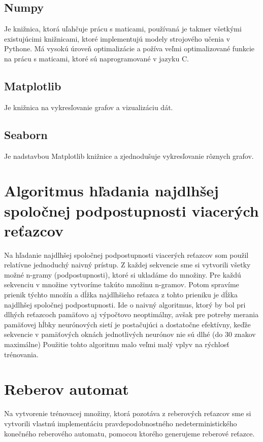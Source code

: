 \subsection{Numpy}
Je knižnica, ktorá uľahčuje prácu s maticami, používaná je takmer všetkými existujúcimi
knižnicami, ktoré implementujú modely strojového učenia v Pythone. Má vysokú úroveň optimalizácie
a požíva veľmi optimalizované funkcie na prácu s maticami, ktoré sú naprogramované v jazyku C.
\subsection{Matplotlib}
Je knižnica na vykresľovanie grafov a vizualizáciu dát.
\subsection{Seaborn}
Je nadstavbou Matplotlib knižnice a zjednodušuje vykresľovanie rôznych grafov.

\section{Algoritmus hľadania najdlhšej spoločnej podpostupnosti viacerých reťazcov}
Na hľadanie najdlhšej spoločnej podpostupnosti viacerých reťazcov som použil relatívne jednoduchý naivný prístup. 
Z každej sekvencie sme si vytvorili všetky možné n-gramy (podpostupnosti), ktoré si ukladáme do množiny.
Pre každú sekvenciu v množine vytvoríme takúto množinu n-gramov. Potom spravíme prienik týchto množín a dĺžka najdlhšieho 
reťazca z tohto prieniku je dĺžka najdlhšej spoločnej podpostupnosti. Ide o naivný algoritmus, ktorý by bol pri
dlhých reťazcoch pamäťovo aj výpočtovo neoptimálny, avšak pre potreby merania pamäťovej hĺbky neurónových sietí
je postačujúci a dostatočne efektívny, keďže sekvencie v pamäťových oknách 
jednotlivých neurónov nie sú dlhé (do 30 znakov maximálne)
Použitie tohto algoritmu malo veľmi malý vplyv na rýchlosť trénovania.

\section{Reberov automat}
Na vytvorenie trénovacej množiny, ktorá pozotáva z reberových reťazcov sme si vytvorili vlastnú implementáciu pravdepodobnostného nedeterministického
konečného reberového automatu, pomocou ktorého generujeme reberové reťazce.